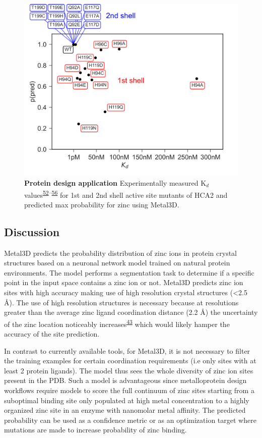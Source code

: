\documentclass[ lineno,
  9pt]{elife}
\begin{document}
\begin{figure}
\hypertarget{fig:hca-kd}{%
\centering
\includegraphics{images/kd_vs_p_nolog_newmethod_newmodel_0.5.png}
\caption{\textbf{Protein design application} Experimentally measured K$_d$ values\textsuperscript{\protect\hyperlink{ref-D3VQQdjb}{52}--\protect\hyperlink{ref-TNbPH3Y1}{56}} for 1st and 2nd shell active site mutants of HCA2 and predicted max probability for zinc using Metal3D.}\label{fig:hca-kd}
}
\end{figure}

\hypertarget{discussion}{%
\subsection{Discussion}\label{discussion}}

Metal3D predicts the probability distribution of zinc ions in protein crystal structures based on a neuronal network model trained on natural protein environments. The model performs a segmentation task to determine if a specific point in the input space contains a zinc ion or not. Metal3D predicts zinc ion sites with high accuracy making use of high resolution crystal structures (\textless2.5 \AA ). The use of high resolution structures is necessary because at resolutions greater than the average zinc ligand coordination distance (2.2 \AA ) the uncertainty of the zinc location noticeably increases\textsuperscript{\protect\hyperlink{ref-Wt0ducot}{43}} which would likely hamper the accuracy of the site prediction.

In contrast to currently available tools, for Metal3D, it is not necessary to filter the training examples for certain coordination requirements (i.e only sites with at least 2 protein ligands). The model thus sees the whole diversity of zinc ion sites present in the PDB. Such a model is advantageous since metalloprotein design workflows require models to score the full continuum of zinc sites starting from a suboptimal binding site only populated at high metal concentration to a highly organized zinc site in an enzyme with nanomolar metal affinity. The predicted probability can be used as a confidence metric or as an optimization target where mutations are made to increase probability of zinc binding.
\end{document}
